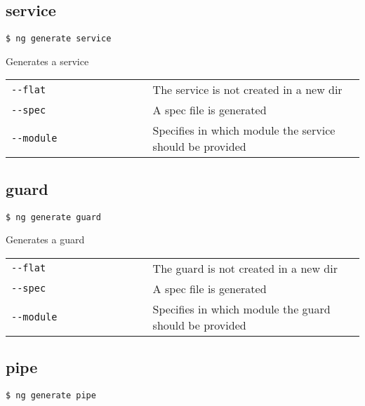 \documentclass[8pt]{extarticle} %
\begin{document}
\begin{multicols*}{3}
  \subsection*{service}

    \vspace{1ex}
    {\tt \$ ng generate service  \itt{[options...]}}
    \vspace{0.6ex}

    {\small Generates a service}
    \vspace{0.6ex}

    \begin{tabular}{L{0.40\linewidth} L{0.60\linewidth}}
      \tt -{}-flat & \small The service is not created in a new dir \\
      \tt -{}-spec & \small A spec file is generated \\
      \tt -{}-module  & \small Specifies in which module the service should be provided \\
    \end{tabular}

  \subsection*{guard}

    \vspace{1ex}
    {\tt \$ ng generate guard  \itt{[options...]}}
    \vspace{0.6ex}

    {\small Generates a guard}
    \vspace{0.6ex}

    \begin{tabular}{L{0.40\linewidth} L{0.60\linewidth}}
      \tt -{}-flat & \small The guard is not created in a new dir \\
      \tt -{}-spec & \small A spec file is generated \\
      \tt -{}-module  & \small Specifies in which module the guard should be provided \\
    \end{tabular}

  \subsection*{pipe}

    \vspace{1ex}
    {\tt \$ ng generate pipe  \itt{[options...]}}
    \vspace{0.6ex}


\end{multicols*}
\end{document}
